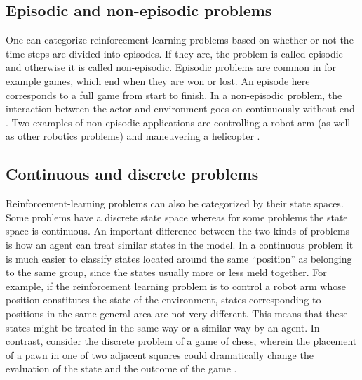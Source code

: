 \subsection{Episodic and non-episodic problems}
One can categorize reinforcement learning problems based on whether or not the time steps are divided into episodes. If they are, the problem is called episodic and otherwise it is called non-episodic. Episodic problems are common in for example games, which end when they are won or lost. An episode here corresponds to a full game from start to finish. In a non-episodic problem, the interaction between the actor and environment goes on continuously without end \parencite{barto1998reinforcement}. Two examples of non-episodic applications are controlling a robot arm (as well as other robotics problems) and maneuvering a helicopter \parencite{ng2006autonomous}. 

\subsection{Continuous and discrete problems}
Reinforcement-learning problems can also be categorized by their state spaces. Some problems have a discrete state space whereas for some problems the state space is continuous. An important difference between the two kinds of problems is how an agent can treat similar states in the model. In a continuous problem it is much easier to classify states located around the same ``position'' as belonging to the same group, since the states usually more or less meld together. For example, if the reinforcement learning problem is to control a robot arm whose position constitutes the state of the environment, states corresponding to positions in the same general area are not very different. This means that these states might be treated in the same way or a similar way by an agent. In contrast, consider the discrete problem of a game of chess, wherein the placement of a pawn in one of two adjacent squares could dramatically change the evaluation of the state and the outcome of the game \parencite{barto1998reinforcement}.
